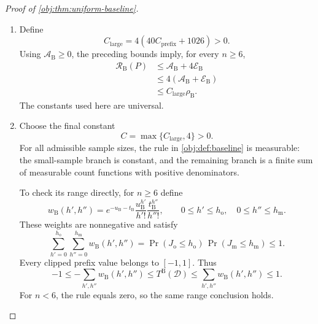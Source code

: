 \documentclass[11pt]{article}
\begin{document}
\begin{proof}[Proof of \cref{obj:thm:uniform-baseline}]
\begin{enumerate}
For the overflow allowance, both pool sizes are at least \(n/3\), giving
\[
\mathcal E_{\mathrm B}\le2e^{-n/3}.
\]
The elementary bound \(x e^{-x}\le e^{-1}\), obtained by maximizing \(x e^{-x}\), together with \(\epsilon\le1/4\), yields
\[
(n\epsilon)\,2e^{-n/3}
\le
\frac n2e^{-n/3}
=
\frac32\left(\frac n3e^{-n/3}\right)
\le
\frac32e^{-1}
\le2.
\]
Since \(n\epsilon>0\), this proves
\[
\mathcal E_{\mathrm B}\le\frac{2}{n\epsilon}.
\]
Combining these estimates gives
\[
\begin{aligned}
\mathcal A_{\mathrm B}+\mathcal E_{\mathrm B}
&\le
\frac{40C_{\mathrm{prefix}}+2}{n\epsilon}
+
1024\left(\frac{d}{(n+m)\epsilon}\right)^2\\
&\le
(40C_{\mathrm{prefix}}+1026)\rho_{\mathrm B}.
\end{aligned}
\]

\item
Define
\[
C_{\mathrm{large}}
=
4(40C_{\mathrm{prefix}}+1026)>0.
\]
Using \(\mathcal A_{\mathrm B}\ge0\), the preceding bounds imply, for every \(n\ge6\),
\[
\begin{aligned}
\mathcal R_{\mathrm B}(P)
&\le
\mathcal A_{\mathrm B}+4\mathcal E_{\mathrm B}\\
&\le
4(\mathcal A_{\mathrm B}+\mathcal E_{\mathrm B})\\
&\le
C_{\mathrm{large}}\rho_{\mathrm B}.
\end{aligned}
\]
The constants used here are universal.

\item
Choose the final constant
\[
C=\max\{C_{\mathrm{large}},4\}>0.
\]
For all admissible sample sizes, the rule in \cref{obj:def:baseline} is measurable: the small-sample branch is constant, and the remaining branch is a finite sum of measurable count functions with positive denominators.

To check its range directly, for \(n\ge6\) define
\[
w_{\mathrm B}(h',h'')
=
e^{-u_{\mathrm B}-t_{\mathrm B}}
\frac{u_{\mathrm B}^{h'}}{h'!}
\frac{t_{\mathrm B}^{h''}}{h''!},
\qquad
0\le h'\le h_{\mathrm o},\quad
0\le h''\le h_{\mathrm m}.
\]
These weights are nonnegative and satisfy
\[
\sum_{h'=0}^{h_{\mathrm o}}
\sum_{h''=0}^{h_{\mathrm m}}
w_{\mathrm B}(h',h'')
=
\Pr(J_{\mathrm o}\le h_{\mathrm o})\,
\Pr(J_{\mathrm m}\le h_{\mathrm m})
\le1.
\]
Every clipped prefix value belongs to \([-1,1]\). Thus
\[
-1
\le
-\sum_{h',h''}w_{\mathrm B}(h',h'')
\le
T^{\mathrm B}(\mathcal D)
\le
\sum_{h',h''}w_{\mathrm B}(h',h'')
\le1.
\]
For \(n<6\), the rule equals zero, so the same range conclusion holds.


\end{enumerate}
\end{proof}
\end{document}
